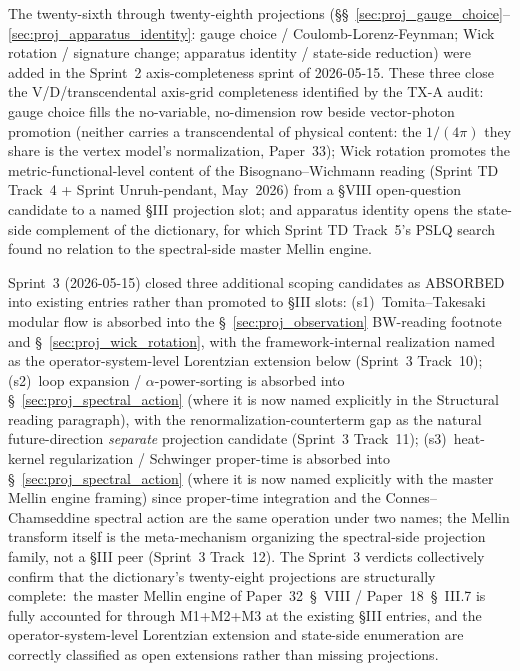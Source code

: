 \documentclass[11pt]{article}
\begin{document}
\begin{enumerate}
The twenty-sixth through twenty-eighth projections
(\S\S~\ref{sec:proj_gauge_choice}--\ref{sec:proj_apparatus_identity}:
gauge choice / Coulomb-Lorenz-Feynman; Wick rotation / signature
change; apparatus identity / state-side reduction) were added in the
Sprint~2 axis-completeness sprint of 2026-05-15.  These three close
the V/D/transcendental axis-grid completeness identified by the
TX-A audit: gauge choice fills the no-variable, no-dimension row
beside vector-photon promotion (neither carries a transcendental of
physical content: the $1/(4\pi)$ they share is the vertex model's
normalization, Paper~33); Wick
rotation promotes the metric-functional-level content of the
Bisognano--Wichmann reading (Sprint TD Track~4 + Sprint Unruh-pendant,
May~2026) from a §VIII open-question candidate to a named §III
projection slot; and apparatus identity opens the state-side
complement of the dictionary, for which Sprint TD Track~5's PSLQ
search found no relation to the spectral-side master Mellin engine.

Sprint~3 (2026-05-15) closed three additional scoping candidates as
ABSORBED into existing entries rather than promoted to §III slots:
(s1)~Tomita--Takesaki modular flow is absorbed into the
\S~\ref{sec:proj_observation} BW-reading footnote and
\S~\ref{sec:proj_wick_rotation}, with the framework-internal realization
named as the operator-system-level Lorentzian extension below
(Sprint~3 Track~10);
(s2)~loop expansion / $\alpha$-power-sorting is absorbed into
\S~\ref{sec:proj_spectral_action} (where it is now named explicitly in
the Structural reading paragraph), with the renormalization-counterterm
gap as the natural future-direction \emph{separate} projection candidate
(Sprint~3 Track~11);
(s3)~heat-kernel regularization / Schwinger proper-time is absorbed into
\S~\ref{sec:proj_spectral_action} (where it is now named explicitly with
the master Mellin engine framing) since proper-time integration and the
Connes--Chamseddine spectral action are the same operation under two
names; the Mellin transform itself is the meta-mechanism organizing
the spectral-side projection family, not a §III peer (Sprint~3 Track~12).
The Sprint~3 verdicts collectively confirm that the dictionary's
twenty-eight projections are structurally complete:\ the master Mellin
engine of Paper~32~\S~VIII / Paper~18~\S~III.7 is fully accounted for
through M1+M2+M3 at the existing §III entries, and the
operator-system-level Lorentzian extension and state-side enumeration
are correctly classified as open extensions rather than missing
projections.


\end{enumerate}
\end{document}
